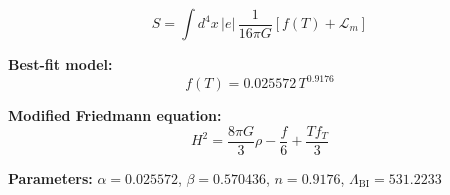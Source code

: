 
\begin{equation}
  S = \int d^4x \, |e| \, \frac{1}{16\pi G} \left[ f(T) + \mathcal{L}_m \right]
\end{equation}

\textbf{Best-fit model:}
\begin{equation}
  f(T) = 0.025572 \, T^{0.9176}
\end{equation}

\textbf{Modified Friedmann equation:}
\begin{equation}
  H^2 = \frac{8\pi G}{3} \rho - \frac{f}{6} + \frac{T f_T}{3}
\end{equation}

\textbf{Parameters:}
$\alpha = 0.025572$, \quad
$\beta = 0.570436$, \quad
$n = 0.9176$, \quad
$\Lambda_{\text{BI}} = 531.2233$